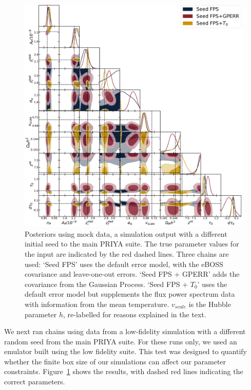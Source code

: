 \begin{figure}
    \centering
    \includegraphics[width=\textwidth]{figures/simdat-seed.pdf}
    \caption{\label{fig:simdat_posteriors}
     
    Posteriors using mock data, a simulation output with a different initial seed to the main PRIYA suite.
    The true parameter values for the input are indicated by the red dashed lines.
    Three chains are used: `Seed FPS' uses the default error model, with the eBOSS covariance and leave-one-out errors.
    `Seed FPS + GPERR' adds the covariance from the Gaussian Process.
    `Seed FPS + $T_0$' uses the default error model but supplements the flux power spectrum data with information from the mean temperature.
    $v_{scale}$ is the Hubble parameter $h$, re-labelled for reasons explained in the text.}
\end{figure}

We next ran chains using data from a low-fidelity simulation with a different random seed from the main PRIYA suite.
For these runs only, we used an emulator built using the low fidelity suite.
This test was designed to quantify whether the finite box size of our simulations can affect our parameter constraints.
Figure~\ref{fig:simdat_posteriors} shows the results, with dashed red lines indicating the correct parameters.


